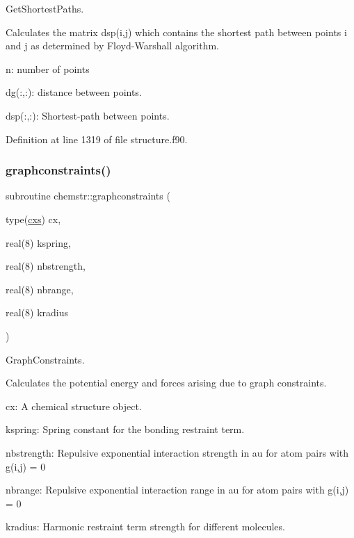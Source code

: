 Get\+Shortest\+Paths. 

Calculates the matrix dsp(i,j) which contains the shortest path between points i and j as determined by Floyd-\/\+Warshall algorithm.


\begin{DoxyItemize}
\item n\+: number of points
\item dg(\+:,\+:)\+: distance between points.
\item dsp(\+:,\+:)\+: Shortest-\/path between points. 
\end{DoxyItemize}

Definition at line 1319 of file structure.\+f90.

\mbox{\label{namespacechemstr_a38779fdbd95d7cfe9b20a456d704f37d}} 
\subsubsection{\texorpdfstring{graphconstraints()}{graphconstraints()}}
{\footnotesize\ttfamily subroutine chemstr\+::graphconstraints (\begin{DoxyParamCaption}\item[{type(\mbox{\hyperlink{structchemstr_1_1cxs}{cxs}})}]{cx,  }\item[{real(8)}]{kspring,  }\item[{real(8)}]{nbstrength,  }\item[{real(8)}]{nbrange,  }\item[{real(8)}]{kradius }\end{DoxyParamCaption})}



Graph\+Constraints. 

Calculates the potential energy and forces arising due to graph constraints.


\begin{DoxyItemize}
\item cx\+: A chemical structure object.
\item kspring\+: Spring constant for the bonding restraint term.
\item nbstrength\+: Repulsive exponential interaction strength in au for atom pairs with g(i,j) = 0
\item nbrange\+: Repulsive exponential interaction range in au for atom pairs with g(i,j) = 0
\item kradius\+: Harmonic restraint term strength for different molecules. 
\end{DoxyItemize}

